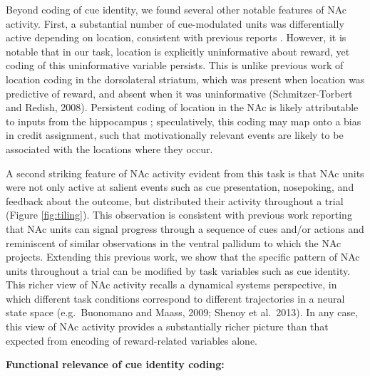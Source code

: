 \documentclass[11pt]{article}
\let\cite=\citep
\begin{document}
Beyond coding of cue identity, we found several other notable features
of NAc activity. First, a substantial number of cue-modulated units
was differentially active depending on location, consistent with
previous reports
\cite{Lavoie1994,Wiener2003,Mulder2005,Strait2016}. However, it is
notable that in our task, location is explicitly uninformative about
reward, yet coding of this uninformative variable persists. This is
unlike previous work of location coding in the dorsolateral striatum,
which was present when location was predictive of reward, and absent
when it was uninformative (Schmitzer-Torbert and Redish,
2008). Persistent coding of location in the NAc is likely attributable
to inputs from the hippocampus
\cite{Tabuchi2000,VanderMeer2011,Lansink2016,Sjulson2017};
speculatively, this coding may map onto a bias in credit assignment,
such that motivationally relevant events are likely to be associated
with the locations where they occur.

A second striking feature of NAc activity evident from this task is
that NAc units were not only active at salient events such as cue
presentation, nosepoking, and feedback about the outcome, but
distributed their activity throughout a trial (Figure
\ref{fig:tiling}). This observation is consistent with previous work
reporting that NAc units can signal progress through a sequence of
cues and/or actions
\cite{Shidara1998,Mulder2004,Khamassi2008,Berke2009,Lansink2012,Atallah2014}
and reminiscent of similar observations in the ventral pallidum
\cite{Tingley2018} to which the NAc projects. Extending this previous
work, we show that the specific pattern of NAc units throughout a
trial can be modified by task variables such as cue identity. This
richer view of NAc activity recalls a dynamical systems perspective,
in which different task conditions correspond to different
trajectories in a neural state space (e.g.\ Buonomano and Maass, 2009;
Shenoy et al.\ 2013). In any case, this view of NAc activity provides
a substantially richer picture than that expected from encoding of
reward-related variables alone.

{\bf Functional relevance of cue identity coding:}
\end{document}
